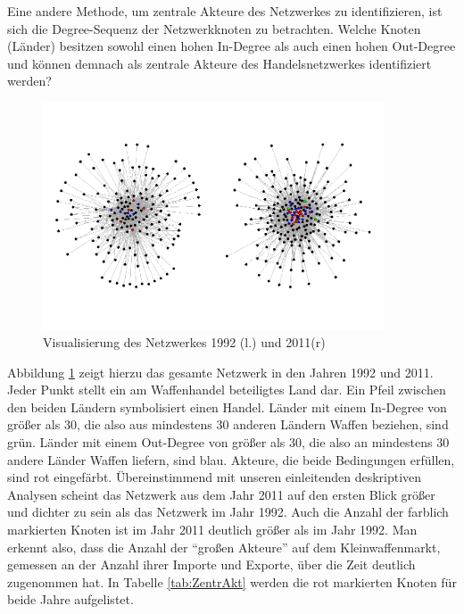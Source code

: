 \documentclass[a4paper,ngerman,oneside,titlepage,bibliography=totoc,11pt]{scrreprt}
\begin{document}
Eine andere Methode, um zentrale Akteure des Netzwerkes zu identifizieren, ist sich die Degree-Sequenz der Netzwerkknoten zu betrachten. Welche Knoten (Länder) besitzen sowohl einen hohen In-Degree als auch einen hohen Out-Degree und können demnach als zentrale Akteure des Handelsnetzwerkes identifiziert werden?
\begin{figure}[h]
	\centering
		\includegraphics[width=0.90\textwidth]{Grafiken/ts_network.png}
	\caption{Visualisierung des Netzwerkes 1992 (l.) und 2011(r)}
	\label{fig:ts_network}
\end{figure}

Abbildung \ref{fig:ts_network} zeigt hierzu das gesamte Netzwerk in den Jahren 1992 und 2011. Jeder Punkt stellt ein am Waffenhandel beteiligtes Land dar. Ein Pfeil zwischen den beiden Ländern symbolisiert einen Handel. Länder mit einem In-Degree von größer als 30, die also aus mindestens 30 anderen Ländern Waffen beziehen, sind grün. Länder mit einem Out-Degree von größer als 30, die also an mindestens 30 andere Länder Waffen liefern, sind blau. Akteure, die beide Bedingungen erfüllen, sind rot eingefärbt. Übereinstimmend mit unseren einleitenden deskriptiven Analysen scheint das Netzwerk aus dem Jahr 2011 auf den ersten Blick größer und dichter zu sein als das Netzwerk im Jahr 1992. Auch die Anzahl der farblich markierten Knoten ist im Jahr 2011 deutlich größer als im Jahr 1992. Man erkennt also, dass die Anzahl der "`großen Akteure"' auf dem Kleinwaffenmarkt, gemessen an der Anzahl ihrer Importe und Exporte, über die Zeit deutlich zugenommen hat. In Tabelle \ref{tab:ZentrAkt} werden die rot markierten Knoten für beide Jahre aufgelistet. 
\end{document}
